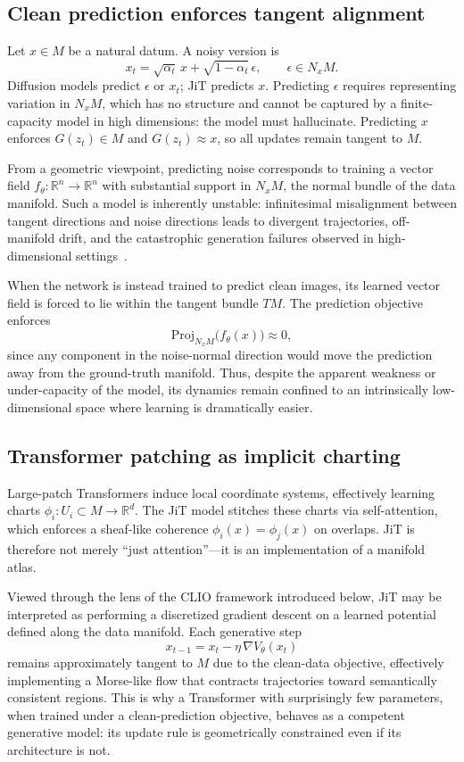 \documentclass[11pt,a4paper,twocolumn]{article}
\begin{document}
\subsection{Clean prediction enforces tangent alignment}

Let $x \in M$ be a natural datum. A noisy version is
\[
x_t = \sqrt{\alpha_t}\, x + \sqrt{1 - \alpha_t}\,\epsilon,
\qquad \epsilon \in N_x M.
\]
Diffusion models predict $\epsilon$ or $x_t$; JiT predicts $x$.
Predicting $\epsilon$ requires representing variation in $N_x M$, which
has no structure and cannot be captured by a finite-capacity model in
high dimensions: the model must hallucinate. Predicting $x$ enforces
$G(z_t) \in M$ and $G(z_t) \approx x$, so all updates remain tangent
to $M$.

From a geometric viewpoint, predicting noise corresponds to training a
vector field $f_\theta : \mathbb{R}^n \to \mathbb{R}^n$ with
substantial support in $N_x M$, the normal bundle of the data manifold.
Such a model is inherently unstable: infinitesimal misalignment between
tangent directions and noise directions leads to divergent trajectories,
off-manifold drift, and the catastrophic generation failures observed in
high-dimensional settings~\cite{li2025backtobasics}.

When the network is instead trained to predict clean images, its learned
vector field is forced to lie within the tangent bundle $TM$. The
prediction objective enforces
\[
\mathrm{Proj}_{N_x M}\!\big(f_\theta(x)\big) \approx 0,
\]
since any component in the noise-normal direction would move the
prediction away from the ground-truth manifold. Thus, despite the
apparent weakness or under-capacity of the model, its dynamics remain
confined to an intrinsically low-dimensional space where learning is
dramatically easier.

\subsection{Transformer patching as implicit charting}

Large-patch Transformers induce local coordinate systems, effectively
learning charts $\phi_i : U_i \subset M \to \mathbb{R}^d$. The JiT
model stitches these charts via self-attention, which enforces a
sheaf-like coherence $\phi_i(x) = \phi_j(x)$ on overlaps. JiT is
therefore not merely ``just attention''---it is an implementation of a
manifold atlas.

Viewed through the lens of the CLIO framework introduced below, JiT
may be interpreted as performing a discretized gradient descent on a
learned potential defined along the data manifold. Each generative step
\[
x_{t-1} = x_t - \eta\,\nabla V_\theta(x_t)
\]
remains approximately tangent to $M$ due to the clean-data objective,
effectively implementing a Morse-like flow that contracts trajectories
toward semantically consistent regions. This is why a Transformer with
surprisingly few parameters, when trained under a clean-prediction
objective, behaves as a competent generative model: its update rule is
geometrically constrained even if its architecture is not.
\end{document}
